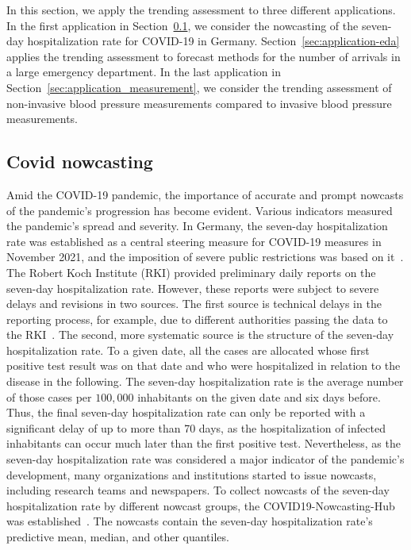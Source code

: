 In this section, we apply the trending assessment to three different applications.
In the first application in Section~\ref{sec:application-covid}, we consider the nowcasting of the seven-day hospitalization rate for COVID-19 in Germany.
Section~\ref{sec:application-eda} applies the trending assessment to forecast methods for the number of arrivals in a large emergency department.
In the last application in Section~\ref{sec:application_measurement}, we consider the trending assessment of non-invasive blood pressure measurements compared to invasive blood pressure measurements.

\subsection{Covid nowcasting} \label{sec:application-covid}

Amid the COVID-19 pandemic, the importance of accurate and prompt nowcasts of the pandemic's progression has become evident.
Various indicators measured the pandemic's spread and severity. 
In Germany, the seven-day hospitalization rate was established as a central steering measure for COVID-19 measures in November 2021, and the imposition of severe public restrictions was based on it~\parencite{RobertKochInstitute2021}. 
The Robert Koch Institute (RKI) provided preliminary daily reports on the seven-day hospitalization rate.
However, these reports were subject to severe delays and revisions in two sources.
The first source is technical delays in the reporting process, for example, due to different authorities passing the data to the RKI~\parencite{RobertKochInstitute2024}.
The second, more systematic source is the structure of the seven-day hospitalization rate.
To a given date, all the cases are allocated whose first positive test result was on that date and who were hospitalized in relation to the disease in the following.
The seven-day hospitalization rate is the average number of those cases per $100,000$ inhabitants on the given date and six days before.
Thus, the final seven-day hospitalization rate can only be reported with a significant delay of up to more than 70 days, as the hospitalization of infected inhabitants can occur much later than the first positive test.
Nevertheless, as the seven-day hospitalization rate was considered a major indicator of the pandemic's development, many organizations and institutions started to issue nowcasts, including research teams and newspapers.
To collect nowcasts of the seven-day hospitalization rate by different nowcast groups, the COVID19-Nowcasting-Hub was established~\parencite{ChairOfEconometricsAndStatisticsAtKarlsruheInstituteOfTechnology2024}.
The nowcasts contain the seven-day hospitalization rate's predictive mean, median, and other quantiles.

